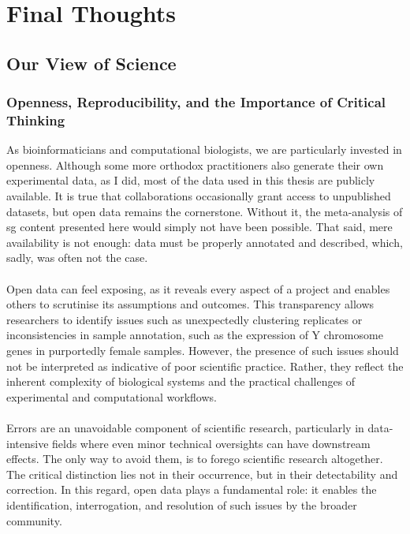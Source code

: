 \chapter{Final Thoughts}

\section{Our View of Science}

\subsection{Openness, Reproducibility, and the Importance of Critical Thinking}

As bioinformaticians and computational biologists, we are particularly invested in openness. Although some more orthodox practitioners also generate their own experimental data, as I did, most of the data used in this thesis are publicly available. It is true that collaborations occasionally grant access to unpublished datasets, but open data remains the cornerstone. Without it, the meta-analysis of \gls{sg} content presented here would simply not have been possible. That said, mere availability is not enough: data must be properly annotated and described, which, sadly, was often not the case.
\\
\\
Open data can feel exposing, as it reveals every aspect of a project and enables others to scrutinise its assumptions and outcomes. This transparency allows researchers to identify issues such as unexpectedly clustering replicates\cite{matheny_rna_2021, matheny_corrigendum_2023} or inconsistencies in sample annotation, such as the expression of Y chromosome genes in purportedly female samples\cite{padron_proximity_2019}. However, the presence of such issues should not be interpreted as indicative of poor scientific practice. Rather, they reflect the inherent complexity of biological systems and the practical challenges of experimental and computational workflows.
\\
\\
Errors are an unavoidable component of scientific research, particularly in data-intensive fields where even minor technical oversights can have downstream effects. The only way to avoid them, is to forego scientific research altogether. The critical distinction lies not in their occurrence, but in their detectability and correction. In this regard, open data plays a fundamental role: it enables the identification, interrogation, and resolution of such issues by the broader community.
